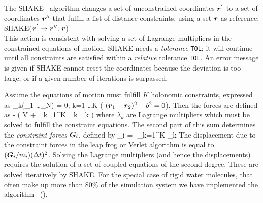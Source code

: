 \subsection{}
The SHAKE~\cite{Ryckaert77} algorithm changes a set of unconstrained
coordinates $\mbox{\boldmath ${r}$}^{'}$ to a set of coordinates $\mbox{\boldmath ${r}$}''$ that
fulfill a  list of distance constraints, using a set $\mbox{\boldmath ${r}$}$ as
reference: \\[1ex] 
\hspace*{5em} SHAKE($\mbox{\boldmath ${r}$}^{'} \rightarrow  \mbox{\boldmath ${r}$}'';\,  \mbox{\boldmath ${r}$}$) \\[1ex]
This action is consistent with solving a set of Lagrange multipliers
in the constrained equations of motion. SHAKE needs a {\em tolerance}
\verb'TOL'; it will continue until all constraints are satisfied
within a {\em relative} tolerance \verb'TOL'. An error message is
given if SHAKE cannot reset the coordinates because the deviation is
too large, or if a given number of iterations is surpassed. 

Assume the equations of motion must fulfill $K$ holonomic constraints,
expressed as
\beq
\sigma_k(_1 \ldots {}_N) = 0; \;\; k=1 \ldots K
\eeq
({\eg} $(\mbox{\boldmath ${r}$}_1 - \mbox{\boldmath ${r}$}_2)^2 - b^2 = 0$). 
Then the forces are defined as 
\beq
-  \left( V + \sum_{k=1}^K \lambda_k
\sigma_k \right)
\eeq
where $\lambda_k$ are Lagrange multipliers which must be solved to
fulfill the constraint equations. The second part of this sum
determines the {\em constraint forces} $\mbox{\boldmath ${G}$}_i$, defined by
\beq
{}_i = -\sum_{k=1}^K \lambda_k 
\eeq
The displacement due to the constraint forces in the leap frog or
Verlet algorithm is equal to $(\mbox{\boldmath ${G}$}_i/m_i)({\Delta t})^2$. Solving the
Lagrange multipliers (and hence the displacements) requires the
solution of a set of coupled equations of the second degree. These are
solved iteratively by SHAKE.
For the special case of rigid water molecules, that often make up more
than 80\% of the simulation system we have implemented the 
algorithm~\cite{Miyamoto92} ().


\newcommand{\fs}[1]{\begin{equation} \label{eqn:#1}}
\newcommand{\fe}{\end{equation}}
\newcommand{\p}{\partial}
\newcommand{\Bm}{\ve{B}}
\newcommand{\M}{\ve{M}}
\newcommand{\iM}{\M^{-1}}
\newcommand{\Tm}{\ve{T}}
\newcommand{\Sm}{\ve{S}}
\newcommand{\fo}{\ve{f}}
\newcommand{\con}{\ve{g}}
\newcommand{\lenc}{\ve{d}}

